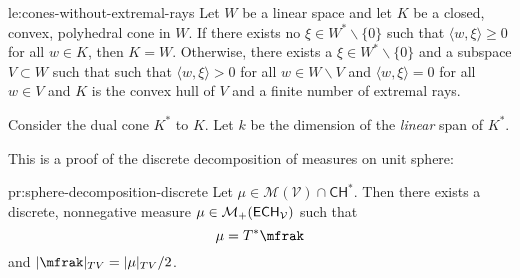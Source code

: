 \documentclass[12pt]{amsart}
\begin{document}
\begin{lemma}{le:cones-without-extremal-rays}
	Let $W$ be a linear space and let $K$ be a closed, convex, polyhedral cone in $W$.
	If there exists no $\xi \in W^*\backslash \{ 0\}$ such that $\langle w, \xi \rangle \geq 0$ for all $w \in K$, then $K = W$. Otherwise,  there exists a $\xi \in W^* \backslash \{0\}$ and a subspace $V \subset W$ such that such that $\langle w, \xi \rangle > 0$ for all $w \in W \backslash V$ and $\langle w, \xi \rangle = 0$ for all $w \in V$ and $K$ is the convex hull of $V$ and a finite number of extremal rays.
\end{lemma}

\begin{Proof}
	Consider the dual cone $K^*$ to $K$. 
	Let $k$ be the dimension of the \emph{linear} span of $K^*$.  	
\end{Proof}

This is a proof of the discrete decomposition of measures on unit sphere:

\begin{proposition}{pr:sphere-decomposition-discrete}
	Let $\mu \in \mathcal{M}(\mathcal{V}) \cap \mathsf{CH}^*$.
	Then there exists a discrete, nonnegative measure $\mu \in \mathcal{M}_+( \mathsf{ECH}_\mathcal{V} )$ such that
	\[
		\mu = T^* \mfrak
	\]
	and $|\mfrak|_{TV} = |\mu|_{TV}/2$.
\end{proposition}
\end{document}
